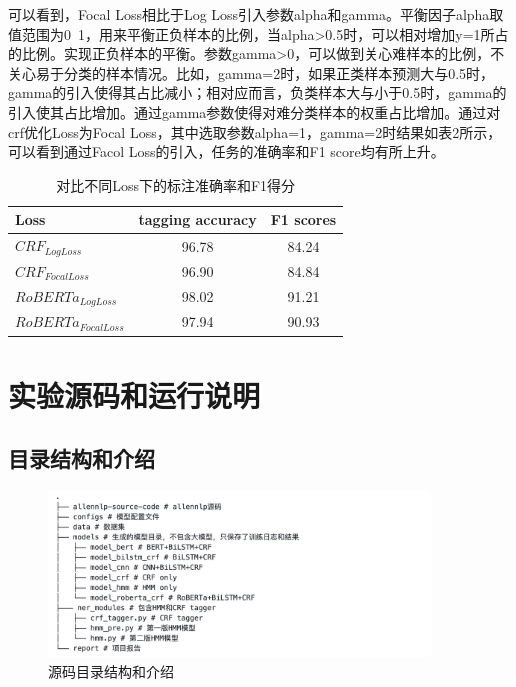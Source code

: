 \documentclass[a4paper, 12pt]{article}
\begin{document}
可以看到，Focal Loss相比于Log Loss引入参数alpha和gamma。平衡因子alpha取值范围为0~1，用来平衡正负样本的比例，当alpha>0.5时，可以相对增加y=1所占的比例。实现正负样本的平衡。参数gamma>0，可以做到关心难样本的比例，不关心易于分类的样本情况。比如，gamma=2时，如果正类样本预测大与0.5时，gamma的引入使得其占比减小；相对应而言，负类样本大与小于0.5时，gamma的引入使其占比增加。通过gamma参数使得对难分类样本的权重占比增加。通过对crf优化Loss为Focal Loss，其中选取参数alpha=1，gamma=2时结果如表2所示，可以看到通过Facol Loss的引入，任务的准确率和F1 score均有所上升。

\begin{table}[htbp]
    \begin{center}
    \large 
    \begin{tabular}{lcc}
        \hline
         Loss & tagging accuracy & F1 scores \\   
        \hline
        
         $CRF_{LogLoss}$       &       96.78 & 84.24      \\
         $CRF_{FocalLoss}$     &       96.90 & 84.84      \\
         $RoBERTa_{LogLoss}$   &       98.02 & 91.21      \\
         $RoBERTa_{FocalLoss}$ &       97.94 & 90.93\\
        \hline
    \end{tabular}
    \end{center}
    \caption {对比不同Loss下的标注准确率和F1得分} 
\end{table}




\section{实验源码和运行说明}

\subsection{目录结构和介绍}

\begin{figure}[htbp]
    \centering
    \includegraphics[width=0.9\textwidth]{tree.png}
    \caption{源码目录结构和介绍}
    \label{fig:}
\end{figure}
\end{document}
